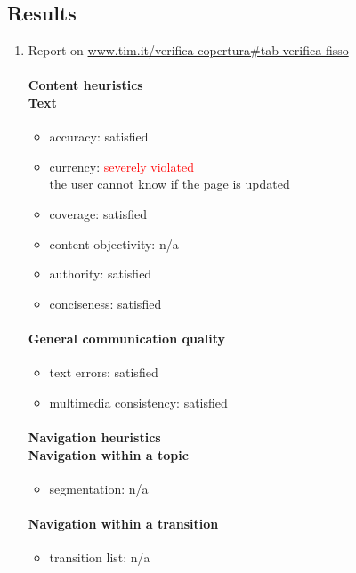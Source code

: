 \subsection{Results}
\begin{enumerate}
	
	
\item Report on \url{www.tim.it/verifica-copertura#tab-verifica-fisso}	
	\paragraph*{Content heuristics \\ Text}
	\begin{itemize}
		\item accuracy: satisfied
		\item currency: \textcolor{red}{severely violated}\\the user cannot know if the page is updated
		\item coverage: satisfied
		\item content objectivity: n/a
		\item authority: satisfied
		\item conciseness: satisfied		
	\end{itemize}
	
	\paragraph*{General communication quality}
	\begin{itemize}
		\item text errors: satisfied
		\item multimedia consistency: satisfied
	\end{itemize}

	\paragraph*{Navigation heuristics \\ Navigation within a topic}
	\begin{itemize}
		\item segmentation: n/a
	\end{itemize}	
	
	\paragraph*{Navigation within a transition}
	\begin{itemize}
		\item transition list: n/a
	\end{itemize}
	

\end{enumerate}
